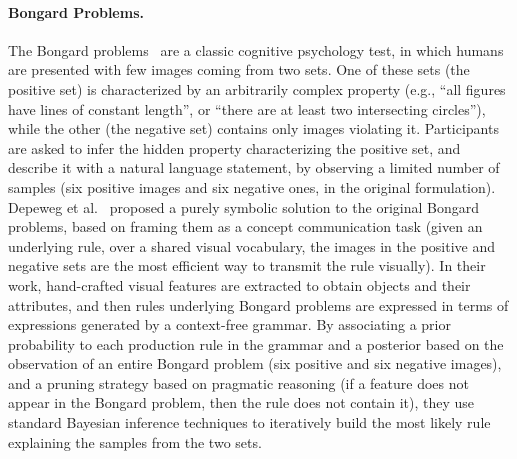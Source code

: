 \paragraph{Bongard Problems.}
The Bongard problems~\cite{bongard1970pattern} are a classic cognitive psychology test, in which humans are presented with few images coming from two sets. One of these sets (the positive set) is characterized by an arbitrarily complex property (e.g., ``all figures have lines of constant length'', or ``there are at least two intersecting circles''), while the other (the negative set) contains only images violating it.
Participants are asked to infer the hidden property characterizing the positive set, and describe it with a natural language statement, by observing a limited number of samples (six positive images and six negative ones, in the original formulation).
%
Depeweg et al.~\cite{depeweg2018solving} proposed a purely symbolic solution to the original Bongard problems, based on framing them as a concept communication task (given an underlying rule, over a shared visual vocabulary, the images in the positive and negative sets are the most efficient way to transmit the rule visually). In their work, hand-crafted visual features are extracted to obtain objects and their attributes, and then rules underlying Bongard problems are expressed in terms of expressions generated by a context-free grammar.
By associating a prior probability to each production rule in the grammar and a posterior based on the observation of an entire Bongard problem (six positive and six negative images), and a pruning strategy based on pragmatic reasoning (if a feature does not appear in the Bongard problem, then the rule does not contain it), they use standard Bayesian inference techniques to iteratively build the most likely rule explaining the samples from the two sets.

